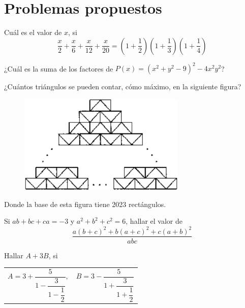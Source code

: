 \section{Problemas propuestos}

\begin{section-problem}
    Cuál es el valor de $x$, si
    \[\frac{x}{2} + \frac{x}{6} + \frac{x}{12} + \frac{x}{20} = \left(1 + \frac{1}{2}\right)\left(1 + \frac{1}{3}\right)\left(1 + \frac{1}{4}\right)\]
\end{section-problem}

\begin{section-problem}
    ¿Cuál es la suma de los factores de $P(x) = (x^2 + y^2 - 9)^2 - 4x^2 y^2$?
\end{section-problem}

\begin{section-problem}
    ¿Cuántos triángulos se pueden contar, cómo máximo, en la siguiente figura?
    \begin{figure}[htb]
        \centering
        \includegraphics[width=8cm]{images/figura}
    \end{figure}

    Donde la base de esta figura tiene 2023 rectángulos.
\end{section-problem}

\begin{section-problem}
    Si $ab + bc + ca = -3$ y $a^2 + b^2 + c^2 = 6$, hallar el valor de
    \[\frac{a(b + c)^2 + b(a + c)^2 + c(a + b)^2}{abc}\]
\end{section-problem}


\begin{section-problem}
    Hallar $A + 3B$, si
    \begin{table}[H]
        \centering
        \begin{tabular}{p{4cm} p{4cm}}
            $A = 3 + \dfrac{5}{1 - \dfrac{3}{1 - \dfrac{1}{2}}},$
            &
            $B = 3 - \dfrac{5}{1 + \dfrac{3}{1 + \dfrac{1}{2}}}$
        \end{tabular}
    \end{table}
\end{section-problem}

